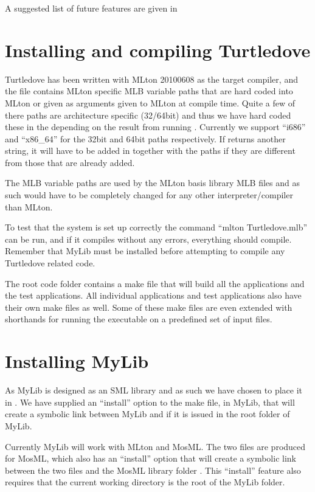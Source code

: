 A suggested list of future features are given in 


\section{Installing and compiling Turtledove}

Turtledove has been written with MLton 20100608 as the target compiler, and the
 file contains MLton specific MLB variable paths that
are hard coded into MLton or given as arguments given to MLton at compile
time. Quite a few of there paths are architecture specific (32/64bit) and thus
we have hard coded these in the  depending on the result from
running . Currently we support ``i686'' and ``x86_64'' for the
32bit and 64bit paths respectively. If  returns another string, it
will have to be added in  together with the paths if they are
different from those that are already added.  

The MLB variable paths are used by the MLton basis library MLB files and as such
would have to be completely changed for any other interpreter/compiler than
MLton.

To test that the system is set up correctly the command ``mlton Turtledove.mlb''
can be run, and if it compiles without any errors, everything should
compile. Remember that MyLib must be installed before attempting to compile any
Turtledove related code.

The root code folder contains a make file that will build all the applications
and the test applications. All individual applications and test applications
also have their own make files as well. Some of these make files are even
extended with shorthands for running the executable on a predefined set of input
files.

\section{Installing MyLib}

As MyLib is designed as an SML library and as such we have chosen to place it in
. We have supplied an ``install'' option to the
make file, in MyLib, that will create a symbolic link between MyLib and
 if it is issued in the root folder of MyLib.

Currently MyLib will work with MLton and MosML. The two  files
are produced for MosML, which also has an ``install'' option that will create a
symbolic link between the two files and the MosML library folder
. This ``install'' feature also requires that the current
working directory is the root of the MyLib folder.

